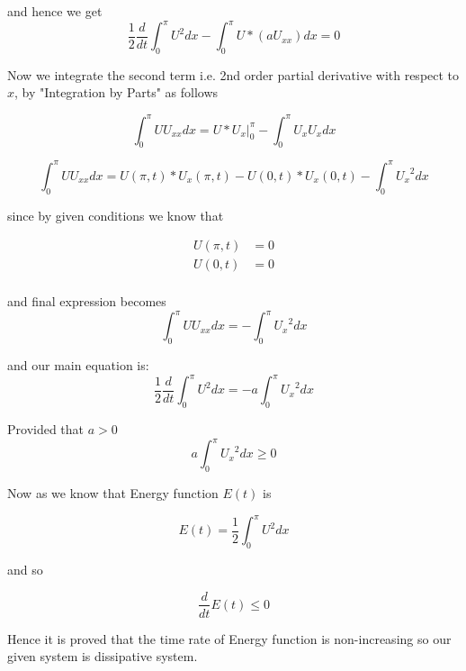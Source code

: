 and hence we get 
\begin{equation}
     \frac{1}{2}\frac{d}{dt} \int_{0}^{\pi}U^{2}dx  - \int_{0}^{\pi}U*(a{U}_{xx})dx = 0
\end{equation}

Now we integrate the second term i.e. 2nd order partial derivative with respect to $x$, by "Integration by Parts" as follows

\begin{equation}
     \int_{0}^{\pi}{U{U}_{xx}}dx = U*U_{x} \Big|_{0}^{\pi} - \int_{0}^{\pi}{U_x}{U_x}dx
\end{equation}


\begin{equation}
     \int_{0}^{\pi}{U{U}_{xx}}dx = U(\pi,t)*U_{x}(\pi,t) - U(0,t)*U_{x}(0,t) - \int_{0}^{\pi}{U_x}^{2}dx
\end{equation}

since by given conditions we know that 

\begin{align*}
    U(\pi,t) &= 0 \\
    U(0,t) &= 0 \\
\end{align*}

and final expression becomes
\begin{equation}
     \int_{0}^{\pi}{U{U}_{xx}}dx = -\int_{0}^{\pi}{U_x}^{2}dx
\end{equation}

and our main equation is:
\begin{equation}
     \frac{1}{2}\frac{d}{dt} \int_{0}^{\pi}U^{2}dx  =-a\int_{0}^{\pi}{U_x}^{2}dx
\end{equation}

Provided that $a>0$
\begin{equation}
     a\int_{0}^{\pi}{U_x}^{2}dx \geq 0
\end{equation}

Now as we know that Energy function  $E(t)$ is 

\begin{equation}
     E(t) = \frac{1}{2} \int_{0}^{\pi} U^{2}dx
\end{equation}

and so 

\begin{equation}
    \frac{d}{dt}E(t) \leq 0
\end{equation}

Hence it is proved that the time rate of Energy function is non-increasing so our given system is dissipative system.

